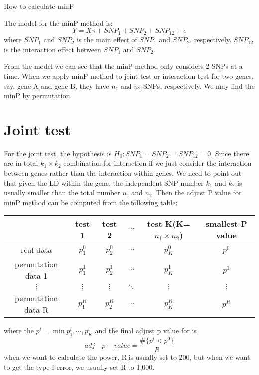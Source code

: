 \documentclass{article}
\begin{document}
    \begin{center}
        \Large{How to calculate minP}
    \end{center}

    \fontsize{11pt}{\baselineskip}\selectfont

    The model for the minP method is:
    \begin{equation*}
        Y=X\gamma+SNP_1+SNP_2+SNP_{12}+e
    \end{equation*}
    where $SNP_1$ and $SNP_2$ is the main effect of $SNP_1$ and $SNP_2$, respectively. $SNP_{12}$ is the interaction effect between $SNP_1$ and $SNP_2$.

    From the model we can see that the minP method only considers 2 SNPs at a time. When we apply minP method to joint test or interaction test for two genes, say, gene A and gene B, they have $n_1$ and $n_2$ SNPs, respectively. We may find the minP by permutation.

    \section{Joint test}

    For the joint test, the hypothesis is $H_0: SNP_1=SNP_2=SNP_{12}=0$, Since there are in total $k_1\times k_2$ combination for interaction if we just consider the interaction between genes rather than the interaction within genes. We need to point out that given the LD within the gene, the independent SNP number $k_1$ and  $k_2$ is usually smaller than the total number $n_1$ and $n_2$. Then the adjust P value for minP method can be computed from the following table:

    \begin{table}[htbp]
        \centering
        \begin{tabular}{c|cccc|c}
            \toprule
            &test 1 & test 2 & $\cdots$ & test K(K=$n_1\times n_2$) & smallest P value\\
            \hline
            real data   &   $p^0_1$ &   $p^0_2$ &   $\cdots$    &   $p^0_K$ &   $p^0$  \\
            permutation data 1&$p^1_1$&$p^1_2$&$\cdots$&$p^1_K$&$p^1$\\
            $\vdots$&$\vdots$&$\vdots$&$\ddots$&$\vdots$&$\vdots$\\
            permutation data R&$p^R_1$&$p^R_2$&$\cdots$&$p^R_K$&$p^R$\\
            \bottomrule
        \end{tabular}
    \end{table}
    where the $p^i=\min{p^i_1,\cdots,p^i_K}$ and the final adjust p value for is
    \begin{equation*}
        adj \quad p-value=\dfrac{\#\{p^i<p^0\}}{R}
    \end{equation*}
    when we want to calculate the power, R is usually set to 200, but when we want to get the type I error, we usually set R to 1,000.
\end{document}

